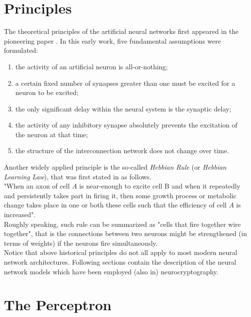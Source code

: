 \documentclass[%
    corpo=11pt,
    twoside,
    stile=classica,
    oldstyle,
    autoretitolo,
    tipotesi=magistrale,
    greek,
    evenboxes,
    english
]{toptesi}
\begin{document}
\section{Principles}
\begin{singlespace}
The theoretical principles of the artificial neural networks first appeared in the pioneering paper \cite{mcculloch}. In this early work, five fundamental assumptions were formulated:
\end{singlespace}
\begin{enumerate}
\item the activity of an artificial neuron is all-or-nothing;
\item a certain fixed number of synapses greater than one must be excited for a neuron to be excited;
\item the only significant delay within the neural system is the synaptic delay;
\item the activity of any inhibitory synapse absolutely prevents the excitation of the neuron at that time;
\item the structure of the interconnection network does not change over time.
\end{enumerate}
Another widely applied principle is the so-called \textit{Hebbian Rule} (or \textit{Hebbian Learning Law}), that was first stated in \cite{hebb} as follows. \\
"When an axon of cell $A$ is near-enough to excite cell B and when it repeatedly and persistently takes part in firing it, then some growth process or metabolic change takes place in one or both these cells such that the efficiency of cell $A$ is increased". \\
Roughly speaking, such rule can be summarized as "cells that fire together wire together", that is the connections between two neurons might be strengthened (in terms of weights) if the neurons fire simultaneously. \\
Notice that above historical principles do not all apply to most modern neural network architectures. Following sections contain the description of the neural network models which have been employed (also in) neurocryptography.
\section{The Perceptron}
\end{document}
